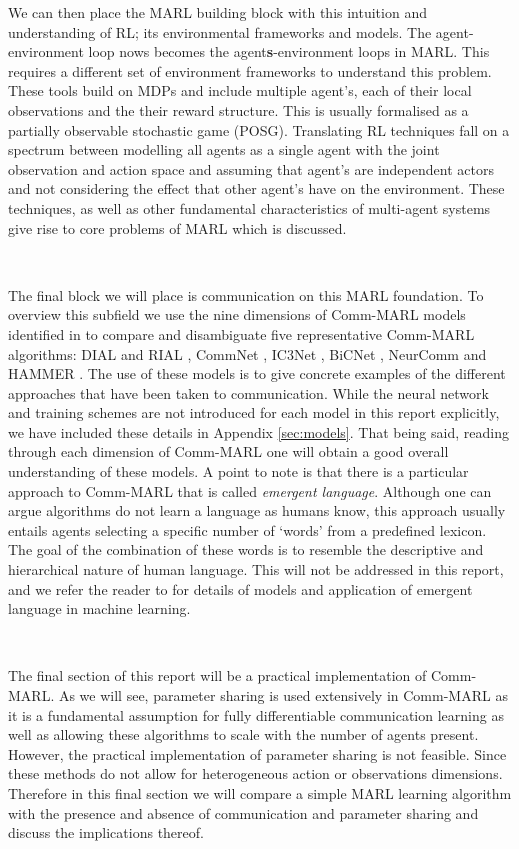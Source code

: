 \documentclass{article}
\begin{document}
We can then place the MARL building block with this intuition and understanding of RL; its environmental frameworks and models. The agent-environment loop nows becomes the agent\textbf{s}-environment loops in MARL. This requires a different set of environment frameworks to understand this problem. These tools build on MDPs and include multiple agent's, each of their local observations and the their reward structure. This is usually formalised as a partially observable stochastic game (POSG). Translating RL techniques fall on a spectrum between modelling all agents as a single agent with the joint observation and action space and assuming that agent's are independent actors and not considering the effect that other agent's have on the environment. These techniques, as well as other fundamental characteristics of multi-agent systems give rise to core problems of MARL which is discussed.


\

The final block we will place is communication on this MARL foundation. To overview this subfield we use the nine dimensions of Comm-MARL models identified in \citet{zhu2024survey} to compare and disambiguate five representative Comm-MARL algorithms: DIAL and RIAL \citep{foerster2016learning}, CommNet \citep{sukhbaatar2016commnet}, IC3Net \citep{singh2018ic3net}, BiCNet \citep{peng2017bicnet}, NeurComm \citep{chu2020NeurComm} and HAMMER \citep{gupta2022HAMMER}. The use of these models is to give concrete examples of the different approaches that have been taken to communication. While the neural network and training schemes are not introduced for each model in this report explicitly, we have included these details in Appendix \ref{sec:models}. That being said, reading through each dimension of Comm-MARL one will obtain a good overall understanding of these models. A point to note is that there is a particular approach to Comm-MARL that is called \textit{emergent language}. Although one can argue algorithms do not learn a language as humans know, this approach usually entails agents selecting a specific number of `words' from a predefined lexicon. The goal of the combination of these words is to resemble the descriptive and hierarchical nature of human language. This will not be addressed in this report, and we refer the reader to \citet{boldt2024review} for details of models and application of emergent language in machine learning.

\

The final section of this report will be a practical implementation of Comm-MARL. As we will see, parameter sharing is used extensively in Comm-MARL as it is a fundamental assumption for fully differentiable communication learning as well as allowing these algorithms to scale with the number of agents present. However, the practical implementation of parameter sharing is not feasible. \citep{terry2023revisiting} Since these methods do not allow for heterogeneous action or observations dimensions. Therefore in this final section we will compare a simple MARL learning algorithm with the presence and absence of communication and parameter sharing and discuss the implications thereof.
\end{document}

